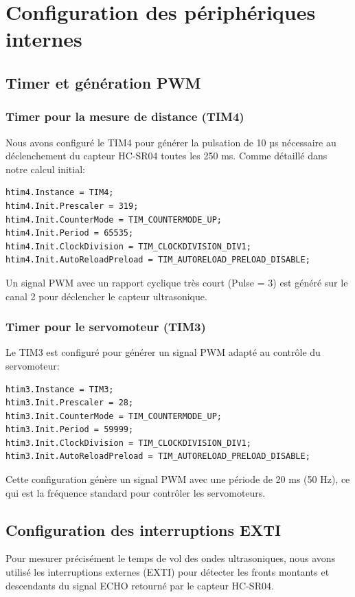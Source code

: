 \documentclass{article}
\begin{document}
\section{Configuration des périphériques internes}

\subsection{Timer et génération PWM}

\subsubsection{Timer pour la mesure de distance (TIM4)}
Nous avons configuré le TIM4 pour générer la pulsation de 10 µs nécessaire au déclenchement du capteur HC-SR04 toutes les 250 ms. Comme détaillé dans notre calcul initial:

\begin{lstlisting}[caption={Configuration du TIM4}, label={lst:tim4config}]
htim4.Instance = TIM4;
htim4.Init.Prescaler = 319;
htim4.Init.CounterMode = TIM_COUNTERMODE_UP;
htim4.Init.Period = 65535;
htim4.Init.ClockDivision = TIM_CLOCKDIVISION_DIV1;
htim4.Init.AutoReloadPreload = TIM_AUTORELOAD_PRELOAD_DISABLE;
\end{lstlisting}

Un signal PWM avec un rapport cyclique très court (Pulse = 3) est généré sur le canal 2 pour déclencher le capteur ultrasonique.

\subsubsection{Timer pour le servomoteur (TIM3)}
Le TIM3 est configuré pour générer un signal PWM adapté au contrôle du servomoteur:

\begin{lstlisting}[caption={Configuration du TIM3}, label={lst:tim3config}]
htim3.Instance = TIM3;
htim3.Init.Prescaler = 28;
htim3.Init.CounterMode = TIM_COUNTERMODE_UP;
htim3.Init.Period = 59999;
htim3.Init.ClockDivision = TIM_CLOCKDIVISION_DIV1;
htim3.Init.AutoReloadPreload = TIM_AUTORELOAD_PRELOAD_DISABLE;
\end{lstlisting}

Cette configuration génère un signal PWM avec une période de 20 ms (50 Hz), ce qui est la fréquence standard pour contrôler les servomoteurs.

\subsection{Configuration des interruptions EXTI}
Pour mesurer précisément le temps de vol des ondes ultrasoniques, nous avons utilisé les interruptions externes (EXTI) pour détecter les fronts montants et descendants du signal ECHO retourné par le capteur HC-SR04.
\end{document}
